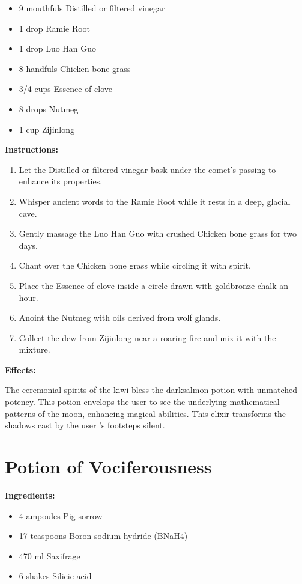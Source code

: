 \documentclass{article}
\begin{document}
\begin{itemize}
  \item 9 mouthfuls Distilled or filtered vinegar
  \item 1 drop Ramie Root
  \item 1 drop Luo Han Guo
  \item 8 handfuls Chicken bone grass
  \item 3/4 cups Essence of clove
  \item 8 drops Nutmeg
  \item 1 cup Zijinlong
\end{itemize}

\textbf{Instructions:}

\begin{enumerate}
  \item Let the Distilled or filtered vinegar bask under the comet’s passing to enhance its properties.
  \item Whisper ancient words to the Ramie Root while it rests in a deep, glacial cave.
  \item Gently massage the Luo Han Guo with crushed Chicken bone grass for two days.
  \item Chant over the Chicken bone grass while circling it with spirit.
  \item Place the Essence of clove inside a circle drawn with goldbronze chalk an hour.
  \item Anoint the Nutmeg with oils derived from wolf glands.
  \item Collect the dew from Zijinlong near a roaring fire and mix it with the mixture.
\end{enumerate}

\textbf{Effects:}

The ceremonial spirits of the kiwi bless the darksalmon potion with unmatched potency. This potion envelops the user to see the underlying mathematical patterns of the moon, enhancing magical abilities. This elixir transforms the shadows cast by the user 's footsteps silent.

\newpage
\section*{Potion of Vociferousness}

\textbf{Ingredients:}

\begin{itemize}
  \item 4 ampoules Pig sorrow
  \item 17 teaspoons Boron sodium hydride (BNaH4)
  \item 470 ml Saxifrage
  \item 6 shakes Silicic acid
\end{itemize}
\end{document}
